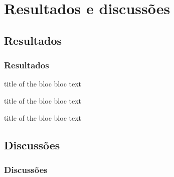 \documentclass[hyperref={pdfpagelabels=false}]{beamer}
\begin{document}
        \section{Resultados e discussões}

            \subsection{Resultados}

            \begin{frame}\frametitle{Resultados}
            \begin{block}{title of the bloc}
            bloc text
            \end{block}

            \begin{exampleblock}{title of the bloc}
            bloc text
            \end{exampleblock}


            \begin{alertblock}{title of the bloc}
            bloc text
            \end{alertblock}
            \end{frame}

            \subsection{Discussões}

            \begin{frame}\frametitle{Discussões}
            \begin{figure}
            \end{figure}
            \end{frame}
\end{document}
